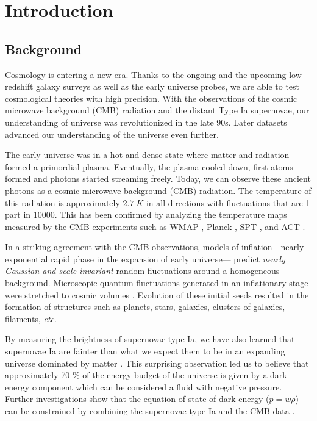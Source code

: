 \chapter*{Introduction}

\section{Background}

Cosmology is entering a new era. Thanks to the ongoing and 
the upcoming low redshift galaxy surveys as well as the early universe probes, 
we are able to test cosmological theories with high precision.
With the observations of the cosmic microwave background (CMB) radiation 
and the distant Type Ia supernovae, our understanding of universe was 
revolutionized in the late 90s. Later datasets advanced our understanding 
of the universe even further.

The early universe was in a hot and dense state where 
matter and radiation formed a primordial plasma. Eventually, the 
plasma cooled down, first atoms formed and photons started streaming freely.  
Today, we can observe these ancient photons as a cosmic microwave background (CMB) radiation. 
The temperature of this radiation is approximately $2.7 \; K$ in all directions with 
fluctuations that are 1 part in 10000. This has been confirmed by analyzing the temperature maps measured 
by the CMB experiments such as WMAP \citep{bennet2013}, Planck \citep{planckII}, 
SPT \citep{george2015}, and ACT \citep{das2014}.  

In a striking agreement with the CMB observations, models of inflation---nearly 
exponential rapid phase in the expansion of early universe--- 
predict \emph{nearly Gaussian and scale invariant} random fluctuations around a homogeneous 
background. Microscopic quantum fluctuations generated in an inflationary 
stage were stretched to cosmic volumes \citep{Guth81,Linde1982,mukhanov1992}. 
Evolution of these initial seeds resulted in the formation of structures such as planets, stars, galaxies, 
clusters of galaxies, filaments, \emph{etc}.

By measuring the brightness of supernovae type Ia, we have also learned 
that supernovae Ia are fainter than what we expect them to be in an 
expanding universe dominated by matter \citep{Riess:1998aa,Schmidt1998,Perlmutter1999,conley2011}. 
This surprising observation led us to believe that approximately 70 $\%$ of 
the energy budget of the universe is given by a dark energy component which 
can be considered a fluid with negative pressure. Further investigations show 
that the equation of state of dark energy ($p = w\rho$) can be constrained 
by combining the supernovae type Ia and the CMB data \citep{Efstathiou1999,betoule2014}.

